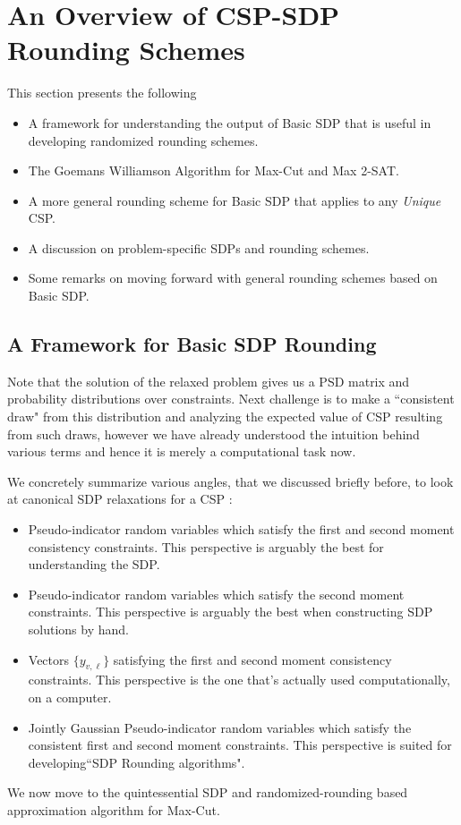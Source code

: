 \section{An Overview of CSP-SDP Rounding Schemes}
This section presents the following
\begin{itemize}
\item A framework for understanding the output of Basic SDP that is useful in developing randomized rounding schemes. 
\item The Goemans Williamson Algorithm for Max-Cut and Max 2-SAT.
\item A more general rounding scheme for Basic SDP that applies to any \textit{Unique} CSP.
\item A discussion on problem-specific SDPs and rounding schemes.
\item Some remarks on moving forward with general rounding schemes based on Basic SDP.
\end{itemize}

\subsection{A Framework for Basic SDP Rounding} 
Note that the solution of the relaxed problem gives us a PSD matrix and probability distributions over constraints. 
Next challenge is to make a ``consistent draw" from this distribution and analyzing the expected value of CSP resulting from such draws, 
however we have already understood the intuition behind various terms and hence it is merely a computational task now.  

We concretely summarize various angles, that we discussed briefly before, to look at canonical SDP relaxations for a CSP :
\begin{itemize}
\item Pseudo-indicator random variables which satisfy the first and second moment consistency constraints. 
This perspective is arguably the best for understanding the SDP. 
\item Pseudo-indicator random variables which satisfy the second moment constraints. 
This perspective is arguably the best when constructing SDP solutions by hand.
\item Vectors $\{ y_{v, \ell} \}$ satisfying the first and second moment consistency constraints.  
This perspective is the one that's actually used computationally, on a computer. 
\item Jointly Gaussian Pseudo-indicator random variables which satisfy the consistent first and second moment constraints. 
This perspective is suited for developing``SDP Rounding algorithms". 
\end{itemize}
We now move to the quintessential SDP and randomized-rounding based approximation algorithm for Max-Cut.

